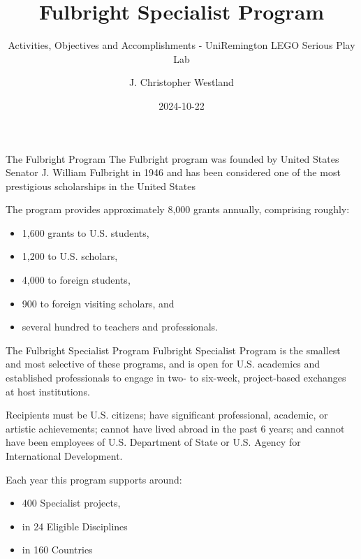 \documentclass[
  ignorenonframetext,
]{beamer}
\title{Fulbright Specialist Program}
\subtitle{Activities, Objectives and Accomplishments - UniRemington LEGO
Serious Play Lab}
\author{J. Christopher Westland}
\date{2024-10-22}
\providecommand{\tightlist}{%
  \setlength{\itemsep}{0pt}\setlength{\parskip}{0pt}}
\begin{document}
\frame{\titlepage}

\begin{frame}{The Fulbright Program}
\label{the-fulbright-program}
The Fulbright program was founded by United States Senator J. William
Fulbright in 1946 and has been considered one of the most prestigious
scholarships in the United States

The program provides approximately 8,000 grants annually, comprising
roughly:

\begin{itemize}
\tightlist
\item
  1,600 grants to U.S. students,
\item
  1,200 to U.S. scholars,
\item
  4,000 to foreign students,
\item
  900 to foreign visiting scholars, and
\item
  several hundred to teachers and professionals.
\end{itemize}
\end{frame}

\begin{frame}{The Fulbright Specialist Program}
\label{the-fulbright-specialist-program}
Fulbright Specialist Program is the smallest and most selective of these
programs, and is open for U.S. academics and established professionals
to engage in two- to six-week, project-based exchanges at host
institutions.

Recipients must be U.S. citizens; have significant professional,
academic, or artistic achievements; cannot have lived abroad in the past
6 years; and cannot have been employees of U.S. Department of State or
U.S. Agency for International Development.

Each year this program supports around:

\begin{itemize}
\tightlist
\item
  400 Specialist projects,
\item
  in 24 Eligible Disciplines
\item
  in 160 Countries
\end{itemize}
\end{frame}
\end{document}
